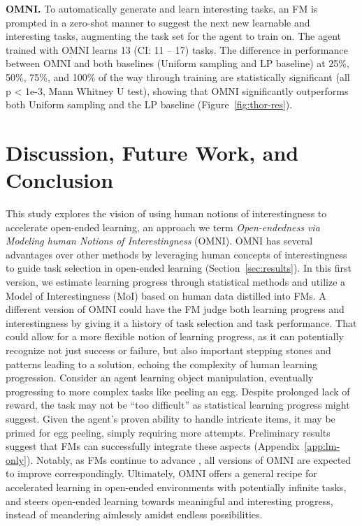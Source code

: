 \documentclass{article} %
\begin{document}
\textbf{OMNI.} To automatically generate and learn interesting tasks, an FM is prompted in a zero-shot manner to suggest the next new learnable and interesting tasks, augmenting the task set for the agent to train on. The agent trained with OMNI learns 13 (CI: 11 -- 17) tasks. The difference in performance between OMNI and both baselines (Uniform sampling and LP baseline) at 25\%, 50\%, 75\%, and 100\% of the way through training are statistically significant (all p < 1e-3, Mann Whitney U test), showing that OMNI significantly outperforms both Uniform sampling and the LP baseline (Figure~\ref{fig:thor-res}).

\section{Discussion, Future Work, and Conclusion}
\label{sec:conclusion}
This study explores the vision of using human notions of interestingness to accelerate open-ended learning, an approach we term \textit{Open-endedness via Modeling human Notions of Interestingness} (OMNI). OMNI has several advantages over other methods by leveraging human concepts of interestingness to guide task selection in open-ended learning (Section~\ref{sec:results}). In this first version, we estimate learning progress through statistical methods and utilize a Model of Interestingness (MoI) based on human data distilled into FMs. A different version of OMNI could have the FM judge both learning progress and interestingness by giving it a history of task selection and task performance. That could allow for a more flexible notion of learning progress, as it can potentially recognize not just success or failure, but also important stepping stones and patterns leading to a solution, echoing the complexity of human learning progression. Consider an agent learning object manipulation, eventually progressing to more complex tasks like peeling an egg. Despite prolonged lack of reward, the task may not be ``too difficult'' as statistical learning progress might suggest. Given the agent's proven ability to handle intricate items, it may be primed for egg peeling, simply requiring more attempts. Preliminary results suggest that FMs can successfully integrate these aspects (Appendix~\ref{app:lm-only}). Notably, as FMs continue to advance \citep{kaplan2020scaling}, all versions of OMNI are expected to improve correspondingly. Ultimately, OMNI offers a general recipe for accelerated learning in open-ended environments with potentially infinite tasks, and steers open-ended learning towards meaningful and interesting progress, instead of meandering aimlessly amidst endless possibilities.
\end{document}
